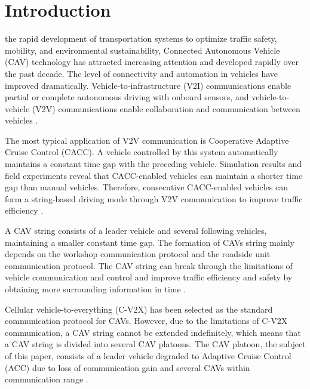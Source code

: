 \documentclass[journal]{IEEEtran}
\begin{document}
\section{Introduction}
\label{Section 1}
% 
% 
% 
% 
 the rapid development of transportation systems to optimize traffic safety, mobility, and environmental sustainability, Connected Autonomous Vehicle (CAV) technology has attracted increasing attention and developed rapidly over the past decade. The level of connectivity and automation in vehicles have improved dramatically. Vehicle-to-infrastructure (V2I) communications enable partial or complete autonomous driving with onboard sensors, and vehicle-to-vehicle (V2V) communications enable collaboration and communication between vehicles \citep{wang2019survey}.


The most typical application of V2V communication is Cooperative Adaptive Cruise Control (CACC). A vehicle controlled by this system automatically maintains a constant time gap with the preceding vehicle. Simulation results and field experiments reveal that CACC-enabled vehicles can maintain a shorter time gap than manual vehicles. Therefore, consecutive CACC-enabled vehicles can form a string-based driving mode through V2V communication to improve traffic efficiency \citep{shladover2015cooperative,wang2020controllability}.


A CAV string consists of a leader vehicle and several following vehicles, maintaining a smaller constant time gap. The formation of CAVs string mainly depends on the workshop communication protocol and the roadside unit communication protocol. The CAV string can break through the limitations of vehicle communication and control and improve traffic efficiency and safety by obtaining more surrounding information in time \citep{hall2005vehicle}.


Cellular vehicle-to-everything (C-V2X) has been selected as the standard communication protocol for CAVs. However, due to the limitations of C-V2X communication, a CAV string cannot be extended indefinitely, which means that a CAV string is divided into several CAV platoons. The CAV platoon, the subject of this paper, consists of a leader vehicle degraded to Adaptive Cruise Control (ACC) due to loss of communication gain and several CAVs within communication range \citep{ruan2021stability}.
\end{document}

